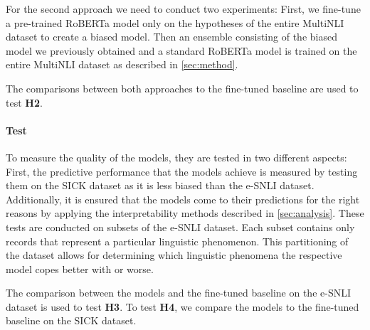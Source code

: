 For the second approach we need to conduct two experiments: First, we fine-tune a pre-trained \ac{RoBERTa} model only on the hypotheses of the entire \ac{MultiNLI} dataset to create a biased model. Then an ensemble consisting of the biased model we previously obtained and a standard \ac{RoBERTa} model is trained on the entire \ac{MultiNLI} dataset as described in \autoref{sec:method}.

The comparisons between both approaches to the fine-tuned baseline are used to test \textbf{H2}.

\paragraph{Test}
To measure the quality of the models, they are tested in two different aspects: First, the predictive performance that the models achieve is measured by testing them on the SICK dataset as it is less biased than the \ac{e-SNLI} dataset. Additionally, it is ensured that the models come to their predictions for the right reasons by applying the interpretability methods described in \autoref{sec:analysis}. These tests are conducted on subsets of the \ac{e-SNLI} dataset. Each subset contains only records that represent a particular linguistic phenomenon. This partitioning of the dataset allows for determining which linguistic phenomena the respective model copes better with or worse.

The comparison between the models and the fine-tuned baseline on the \ac{e-SNLI} dataset is used to test \textbf{H3}. To test \textbf{H4}, we compare the models to the fine-tuned baseline on the \ac{SICK} dataset.
